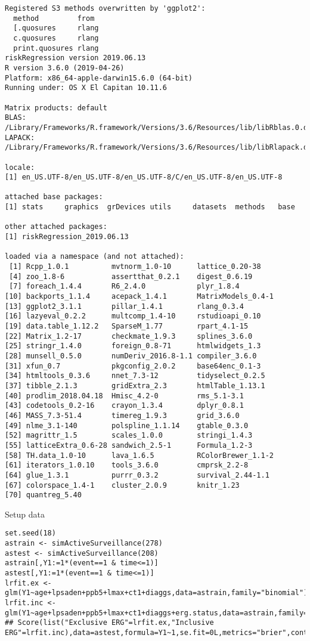 \documentclass{article}
\begin{document}
\begin{verbatim}
Registered S3 methods overwritten by 'ggplot2':
  method         from
  [.quosures     rlang
  c.quosures     rlang
  print.quosures rlang
riskRegression version 2019.06.13
R version 3.6.0 (2019-04-26)
Platform: x86_64-apple-darwin15.6.0 (64-bit)
Running under: OS X El Capitan 10.11.6

Matrix products: default
BLAS:   /Library/Frameworks/R.framework/Versions/3.6/Resources/lib/libRblas.0.dylib
LAPACK: /Library/Frameworks/R.framework/Versions/3.6/Resources/lib/libRlapack.dylib

locale:
[1] en_US.UTF-8/en_US.UTF-8/en_US.UTF-8/C/en_US.UTF-8/en_US.UTF-8

attached base packages:
[1] stats     graphics  grDevices utils     datasets  methods   base

other attached packages:
[1] riskRegression_2019.06.13

loaded via a namespace (and not attached):
 [1] Rcpp_1.0.1          mvtnorm_1.0-10      lattice_0.20-38
 [4] zoo_1.8-6           assertthat_0.2.1    digest_0.6.19
 [7] foreach_1.4.4       R6_2.4.0            plyr_1.8.4
[10] backports_1.1.4     acepack_1.4.1       MatrixModels_0.4-1
[13] ggplot2_3.1.1       pillar_1.4.1        rlang_0.3.4
[16] lazyeval_0.2.2      multcomp_1.4-10     rstudioapi_0.10
[19] data.table_1.12.2   SparseM_1.77        rpart_4.1-15
[22] Matrix_1.2-17       checkmate_1.9.3     splines_3.6.0
[25] stringr_1.4.0       foreign_0.8-71      htmlwidgets_1.3
[28] munsell_0.5.0       numDeriv_2016.8-1.1 compiler_3.6.0
[31] xfun_0.7            pkgconfig_2.0.2     base64enc_0.1-3
[34] htmltools_0.3.6     nnet_7.3-12         tidyselect_0.2.5
[37] tibble_2.1.3        gridExtra_2.3       htmlTable_1.13.1
[40] prodlim_2018.04.18  Hmisc_4.2-0         rms_5.1-3.1
[43] codetools_0.2-16    crayon_1.3.4        dplyr_0.8.1
[46] MASS_7.3-51.4       timereg_1.9.3       grid_3.6.0
[49] nlme_3.1-140        polspline_1.1.14    gtable_0.3.0
[52] magrittr_1.5        scales_1.0.0        stringi_1.4.3
[55] latticeExtra_0.6-28 sandwich_2.5-1      Formula_1.2-3
[58] TH.data_1.0-10      lava_1.6.5          RColorBrewer_1.1-2
[61] iterators_1.0.10    tools_3.6.0         cmprsk_2.2-8
[64] glue_1.3.1          purrr_0.3.2         survival_2.44-1.1
[67] colorspace_1.4-1    cluster_2.0.9       knitr_1.23
[70] quantreg_5.40
\end{verbatim}


Setup data
\lstset{language=r,label= ,caption= ,captionpos=b,numbers=none}
\begin{lstlisting}
set.seed(18)
astrain <- simActiveSurveillance(278)
astest <- simActiveSurveillance(208)
astrain[,Y1:=1*(event==1 & time<=1)]
astest[,Y1:=1*(event==1 & time<=1)]
lrfit.ex <- glm(Y1~age+lpsaden+ppb5+lmax+ct1+diaggs,data=astrain,family="binomial")
lrfit.inc <- glm(Y1~age+lpsaden+ppb5+lmax+ct1+diaggs+erg.status,data=astrain,family="binomial")
## Score(list("Exclusive ERG"=lrfit.ex,"Inclusive ERG"=lrfit.inc),data=astest,formula=Y1~1,se.fit=0L,metrics="brier",contrasts=FALSE)
\end{lstlisting}
\end{document}
